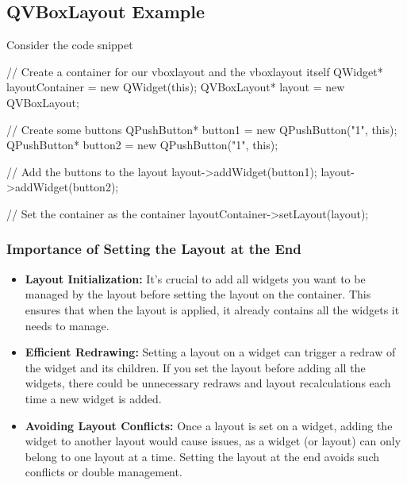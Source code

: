 \documentclass{report}
\begin{document}
    \pagebreak \bigbreak \noindent 
    \subsection{QVBoxLayout Example}
    \bigbreak \noindent 
    Consider the code snippet
    \bigbreak \noindent 
    \begin{cppcode}

        // Create a container for our vboxlayout and the vboxlayout itself
        QWidget* layoutContainer = new QWidget(this);
        QVBoxLayout* layout = new QVBoxLayout;

        // Create some buttons
        QPushButton* button1 = new QPushButton("1", this);
        QPushButton* button2 = new QPushButton("1", this);

        // Add the buttons to the layout
        layout->addWidget(button1);
        layout->addWidget(button2);

        // Set the container as the container
        layoutContainer->setLayout(layout);

    \end{cppcode}

    \bigbreak \noindent 
    \subsubsection{Importance of Setting the Layout at the End}
    \bigbreak \noindent 
    \begin{itemize}
        \item \textbf{Layout Initialization:} It's crucial to add all widgets you want to be managed by the layout before setting the layout on the container. This ensures that when the layout is applied, it already contains all the widgets it needs to manage.
        \item \textbf{Efficient Redrawing:} Setting a layout on a widget can trigger a redraw of the widget and its children. If you set the layout before adding all the widgets, there could be unnecessary redraws and layout recalculations each time a new widget is added.
        \item \textbf{Avoiding Layout Conflicts:} Once a layout is set on a widget, adding the widget to another layout would cause issues, as a widget (or layout) can only belong to one layout at a time. Setting the layout at the end avoids such conflicts or double management.
    \end{itemize}
\end{document}
